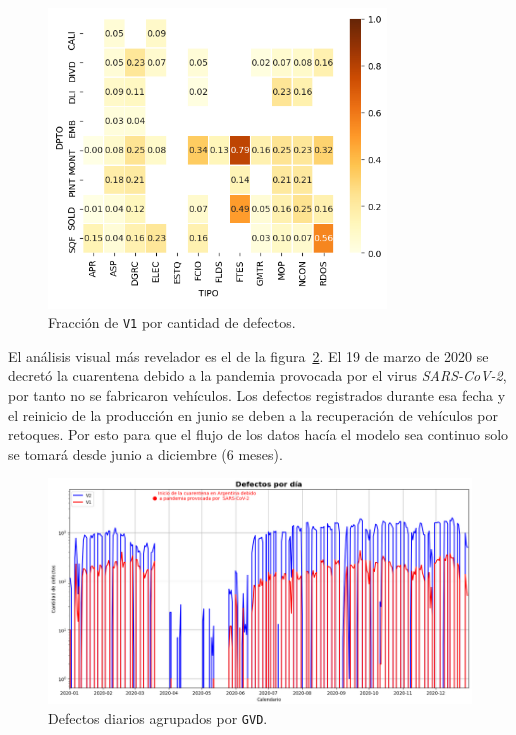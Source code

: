 \documentclass[a4paper,12pt]{article}
\begin{document}
		\begin{figure}[H]
			\begin{center}
				\includegraphics[width=0.8\textwidth]{tesis_58.png}
				\caption{Fracción de \texttt{V1} por cantidad de defectos.}
				\label{fig:heatmapfractionv1}
			\end{center}
		\end{figure}
						
		El análisis visual más revelador es el de la figura~\ref{fig:defectsperday}. El 19 de marzo de 2020 se decretó la cuarentena debido a la pandemia provocada por el virus \textit{SARS-CoV-2}, por tanto no se fabricaron vehículos. Los defectos registrados durante esa fecha y el reinicio de la producción en junio se deben a la recuperación de vehículos por retoques. Por esto para que el flujo de los datos hacía el modelo sea continuo solo se tomará desde junio a diciembre (6 meses).
						
		\begin{figure}[H]
			\begin{center}
				\includegraphics[width=1\textwidth]{tesis_64.png}
				\caption{Defectos diarios agrupados por \texttt{GVD}.}
				\label{fig:defectsperday}
			\end{center}
		\end{figure}
						
\end{document}
